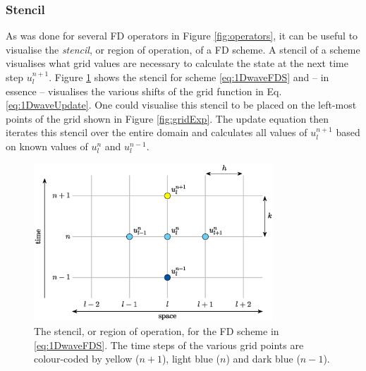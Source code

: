 \subsubsection{Stencil}
As was done for several FD operators in Figure \ref{fig:operators}, it can be useful to visualise the \textit{stencil}, or region of operation, of a FD scheme. A stencil of a scheme visualises what grid values are necessary to calculate the state at the next time step $u_l^{n+1}$. Figure \ref{fig:stencil1DWave} shows the stencil for scheme \eqref{eq:1DwaveFDS} and -- in essence -- visualises the various shifts of the grid function in Eq. \eqref{eq:1DwaveUpdate}. One could visualise this stencil to be placed on the left-most points of the grid shown in Figure \ref{fig:gridExp}. The update equation then iterates this stencil over the entire domain and calculates all values of $u_l^{n+1}$ based on known values of $u_l^n$ and $u_l^{n-1}$.

\begin{figure}[h]
    \centering
    \includegraphics[width=0.8\textwidth]{figures/fdtd/1DWaveStencil.eps}
    \caption{The stencil, or region of operation, for the FD scheme in \eqref{eq:1DwaveFDS}. The time steps of the various grid points are colour-coded by yellow ($n+1$), light blue ($n$) and dark blue ($n-1$).\label{fig:stencil1DWave}}
\end{figure}

